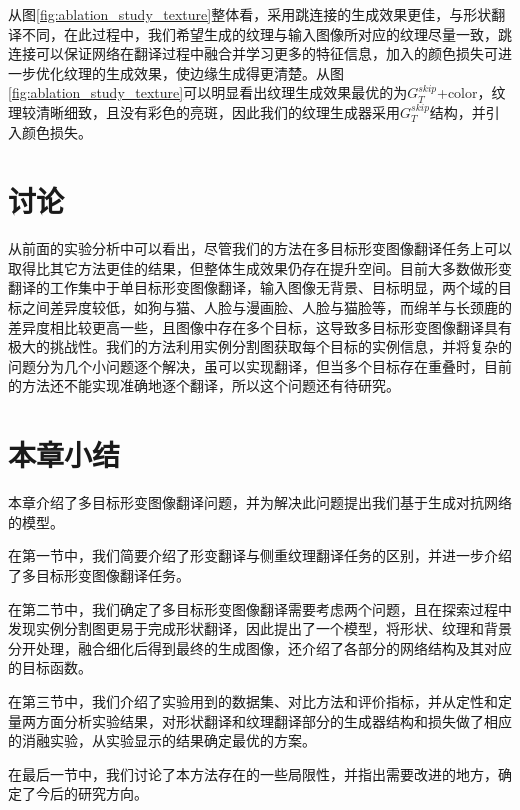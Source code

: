 从图\ref{fig:ablation_study_texture}整体看，采用跳连接的生成效果更佳，与形状翻译不同，在此过程中，我们希望生成的纹理与输入图像所对应的纹理尽量一致，跳连接可以保证网络在翻译过程中融合并学习更多的特征信息，加入的颜色损失可进一步优化纹理的生成效果，使边缘生成得更清楚。从图\ref{fig:ablation_study_texture}可以明显看出纹理生成效果最优的为$G_T^{skip}$+color，纹理较清晰细致，且没有彩色的亮斑，因此我们的纹理生成器采用$G_T^{skip}$结构，并引入颜色损失。

\section{讨论}

从前面的实验分析中可以看出，尽管我们的方法在多目标形变图像翻译任务上可以取得比其它方法更佳的结果，但整体生成效果仍存在提升空间。目前大多数做形变翻译的工作集中于单目标形变图像翻译，输入图像无背景、目标明显，两个域的目标之间差异度较低，如狗与猫、人脸与漫画脸、人脸与猫脸等，而绵羊与长颈鹿的差异度相比较更高一些，且图像中存在多个目标，这导致多目标形变图像翻译具有极大的挑战性。我们的方法利用实例分割图获取每个目标的实例信息，并将复杂的问题分为几个小问题逐个解决，虽可以实现翻译，但当多个目标存在重叠时，目前的方法还不能实现准确地逐个翻译，所以这个问题还有待研究。

\section{本章小结}

本章介绍了多目标形变图像翻译问题，并为解决此问题提出我们基于生成对抗网络的模型。

在第一节中，我们简要介绍了形变翻译与侧重纹理翻译任务的区别，并进一步介绍了多目标形变图像翻译任务。

在第二节中，我们确定了多目标形变图像翻译需要考虑两个问题，且在探索过程中发现实例分割图更易于完成形状翻译，因此提出了一个模型，将形状、纹理和背景分开处理，融合细化后得到最终的生成图像，还介绍了各部分的网络结构及其对应的目标函数。

在第三节中，我们介绍了实验用到的数据集、对比方法和评价指标，并从定性和定量两方面分析实验结果，对形状翻译和纹理翻译部分的生成器结构和损失做了相应的消融实验，从实验显示的结果确定最优的方案。

在最后一节中，我们讨论了本方法存在的一些局限性，并指出需要改进的地方，确定了今后的研究方向。

